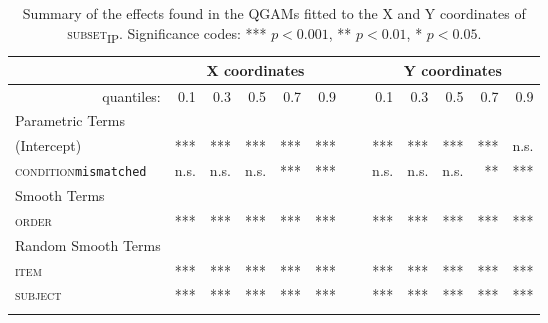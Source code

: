 \begin{table}\fontsize{9}{10}
\caption{Summary of the effects found in the QGAMs fitted to the X and Y coordinates of \textsc{subset\textsubscript{IP}}. Significance codes: *** $p < 0.001$, ** $p < 0.01$, * $p < 0.05$.}
\label{tab:8.6}
\centering
\begin{tabular}{lrrrrrrrrrrr}
\lsptoprule
~                   & \multicolumn{5}{c}{X coordinates} & \multicolumn{1}{c}{}    & \multicolumn{5}{c}{Y coordinates}                               \\
\midrule
\multicolumn{1}{r}{quantiles:}          & 0.1        & 0.3        & 0.5        & 0.7        & 0.9 & ~        & 0.1        & 0.3        & 0.5        & 0.7        & 0.9         \\
\midrule
Parametric Terms    & \textbf{~} & \textbf{~} & \textbf{~} & \textbf{~} & \textbf{~} & \textbf{~} & \textbf{~} & \textbf{~} & \textbf{~} & \textbf{~}  \\
\midrule
(Intercept)         & ***        & ***        & ***        & ***        & *** & ~        & ***        & ***        & ***        & ***        & n.s.          \\
\textsc{condition}\texttt{mismatched} & n.s.       & n.s.          & n.s.        & ***        & *** & ~        & n.s.       & n.s.        & n.s.        & **        & ***         \\
\midrule
Smooth Terms        & \textbf{~} & \textbf{~} & \textbf{~} & \textbf{~} & \textbf{~} & \textbf{~} & \textbf{~} & \textbf{~} & \textbf{~} & \textbf{~}  \\
\midrule
\textsc{order}               & ***        & ***        & ***        & ***        & *** & ~        & ***        & ***        & ***        & ***        & ***         \\
\midrule
Random Smooth Terms & \textbf{~} & \textbf{~} & \textbf{~} & \textbf{~} & \textbf{~} & \textbf{~} & \textbf{~} & \textbf{~} & \textbf{~} & \textbf{~}  \\
\midrule
\textsc{item}                & ***        & ***        & ***        & ***        & *** & ~        & ***        & ***        & ***        & ***        & ***         \\
\textsc{subject}             & ***        & ***        & ***        & ***        & *** & ~        & ***        & ***        & ***        & ***        & ***        \\
\lspbottomrule
\end{tabular}
\end{table}

